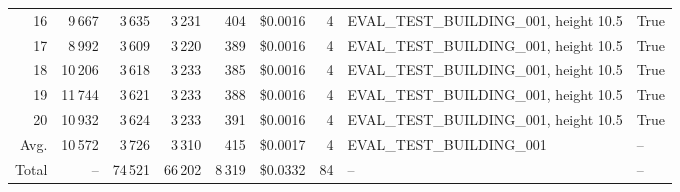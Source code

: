 \documentclass[a4paper,11pt]{article}
\begin{document}
\begin{table}[ht]
\begin{tabular}{r r r r r r r p{3cm} l}
16 & 9\,667 & 3\,635 & 3\,231 & 404 & \$0.0016 & 4 & EVAL\_TEST\_BUILDING\_001, height 10.5 & True \\
17 & 8\,992 & 3\,609 & 3\,220 & 389 & \$0.0016 & 4 & EVAL\_TEST\_BUILDING\_001, height 10.5 & True \\
18 & 10\,206 & 3\,618 & 3\,233 & 385 & \$0.0016 & 4 & EVAL\_TEST\_BUILDING\_001, height 10.5 & True \\
19 & 11\,744 & 3\,621 & 3\,233 & 388 & \$0.0016 & 4 & EVAL\_TEST\_BUILDING\_001, height 10.5 & True \\
20 & 10\,932 & 3\,624 & 3\,233 & 391 & \$0.0016 & 4 & EVAL\_TEST\_BUILDING\_001, height 10.5 & True \\
\hline
Avg. & 10\,572 & 3\,726 & 3\,310 & 415 & \$0.0017 & 4 & EVAL\_TEST\_BUILDING\_001 & -- \\
Total & -- & 74\,521 & 66\,202 & 8\,319 & \$0.0332 & 84 & -- & -- \\
\hline
\end{tabular}
\end{table}

\clearpage
\end{document}
